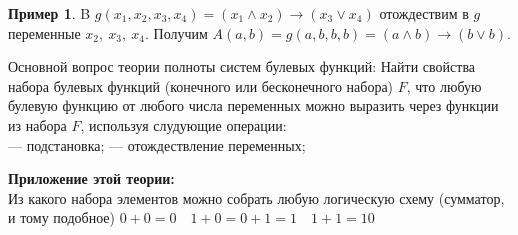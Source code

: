 \documentclass[12pt,oneside]{article}
\theoremstyle{definition}
\newtheorem{exmp}{Пример}
\begin{document}
\begin{exmp}B
$g(x_1, x_2, x_3, x_4) = (x_1\wedge x_2) \longrightarrow (x_3\vee x_4)$ отождествим в $g$ переменные $x_2,\ x_3,\ x_4$. Получим $A(a, b) = g(a, b, b, b) = (a\wedge b) \longrightarrow (b\vee b)$.
\end{exmp}

Основной вопрос теории полноты систем булевых функций: Найти свойства набора булевых функций (конечного или бесконечного набора) $F$, что любую булевую функцию от любого числа переменных можно выразить через функции из набора $F$, используя слудующие операции:\\
--- подстановка;
--- отождествление переменных;

\textbf{Приложение этой теории:}\\
Из какого набора элементов можно собрать любую логическую схему (сумматор, и тому подобное)
$0+0=0\quad 1+0=0+1=1\quad 1+1=10$










 
\end{document}
